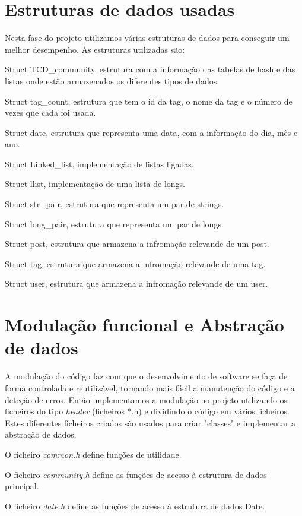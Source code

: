 \documentclass[10pt]{report}
\newcommand\tab[1][0.5cm]{\hspace*{#1}}
\begin{document}
\section{Estruturas de dados usadas}

\tab Nesta fase do projeto utilizamos várias estruturas de dados para conseguir um melhor desempenho. As estruturas utilizadas são:

Struct TCD\_community, estrutura com a informação das tabelas de hash e das listas onde estão armazenados os diferentes tipos de dados.

Struct tag\_count, estrutura que tem o id da tag, o nome da tag e o número de vezes que cada foi usada.

Struct date, estrutura que representa uma data, com a informação do dia, mês e ano.

Struct Linked\_list, implementação de listas ligadas.

Struct llist, implementação de uma lista de longs.

Struct str\_pair, estrutura que representa um par de strings.

Struct long\_pair, estrutura que representa um par de longs.

Struct post, estrutura que armazena a infromação relevande de um post.

Struct tag, estrutura que armazena a infromação relevande de uma tag.

Struct user, estrutura que armazena a infromação relevande de um user.

\section{Modulação funcional e Abstração de dados}

\tab A modulação do código faz com que o desenvolvimento de software se faça de forma controlada e reutilizável, tornando mais fácil a manutenção do código e a deteção de erros. Então implementamos a modulação no projeto utilizando os ficheiros do tipo \textit{header} (ficheiros *.h) e dividindo o código em vários ficheiros. Estes diferentes ficheiros criados são usados para criar "classes" e implementar a abstração de dados.

O ficheiro \textit{common.h} define funções de utilidade.

O ficheiro \textit{community.h} define as funções de acesso à estrutura de dados principal.

O ficheiro \textit{date.h} define as funções de acesso à estrutura de dados Date.
\end{document}

